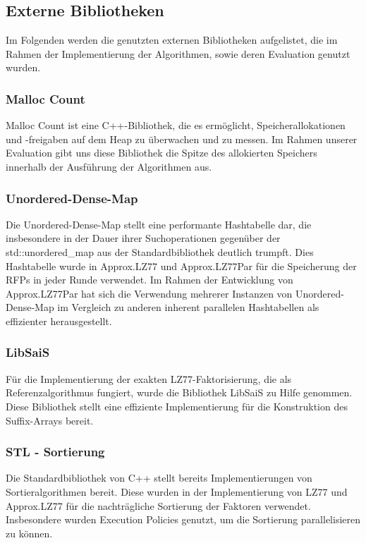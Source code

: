 \subsection{Externe Bibliotheken}
Im Folgenden werden die genutzten externen Bibliotheken aufgelistet, die im Rahmen der Implementierung der Algorithmen, sowie deren Evaluation genutzt wurden.
\subsubsection{Malloc Count} \label{malloccount}
Malloc Count\cite{malloc_count} ist eine C++-Bibliothek, die es ermöglicht, Speicherallokationen und -freigaben auf dem Heap zu überwachen und zu messen. Im
Rahmen unserer Evaluation gibt uns diese Bibliothek die Spitze des allokierten Speichers innerhalb der Ausführung der Algorithmen aus.

\subsubsection{Unordered-Dense-Map} \label{unordereddense}
Die Unordered-Dense-Map \cite{unordered_dense} stellt eine performante Hashtabelle dar, die insbesondere in der Dauer ihrer Suchoperationen gegenüber
der std::unordered\_map aus der Standardbibliothek deutlich trumpft. Dies Hashtabelle wurde in Approx.LZ77 und Approx.LZ77Par für die Speicherung der
RFPs in jeder Runde verwendet. Im Rahmen der Entwicklung von Approx.LZ77Par hat sich die Verwendung mehrerer Instanzen von Unordered-Dense-Map im Vergleich
zu anderen inherent parallelen Hashtabellen \cite{oneapi} \cite{sharded_map} als effizienter herausgestellt.

\subsubsection{LibSaiS}
Für die Implementierung der exakten LZ77-Faktorisierung, die als Referenzalgorithmus fungiert, wurde die Bibliothek LibSaiS \cite{libsais} zu Hilfe genommen. Diese
Bibliothek stellt eine effiziente Implementierung für die Konstruktion des Suffix-Arrays bereit.

\subsubsection{STL - Sortierung}
Die Standardbibliothek von C++ stellt bereits Implementierungen von Sortieralgorithmen bereit. Diese wurden in der Implementierung von LZ77 und Approx.LZ77 für
die nachträgliche Sortierung der Faktoren verwendet. Insbesondere wurden Execution Policies \cite{execpol} genutzt, um die Sortierung parallelisieren zu können.

